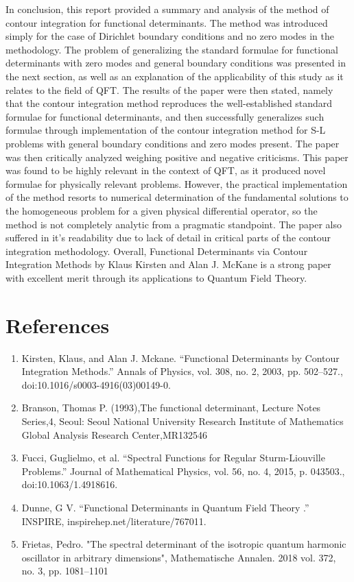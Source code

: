 \documentclass[12]{article}
\begin{document}
In conclusion, this report provided a summary and analysis of the method of contour integration for functional determinants. The method was introduced simply for the case of Dirichlet boundary conditions and no zero modes in the methodology. The problem of generalizing the standard formulae for functional determinants with zero modes and general boundary conditions was presented in the next section, as well as an explanation of the applicability of this study as it relates to the field of QFT. The results of the paper were then stated, namely that the contour integration method reproduces the well-established standard formulae for functional determinants, and then successfully generalizes such formulae through implementation of the contour integration method for S-L problems with general boundary conditions and zero modes present. The paper was then critically analyzed weighing positive and negative criticisms. This paper was found to be highly relevant in the context of QFT, as it produced novel formulae for physically relevant problems. However, the practical implementation of the method resorts to numerical determination of the fundamental solutions to the homogeneous problem for a given physical differential operator, so the method is not completely analytic from a pragmatic standpoint. The paper also suffered in it's readability due to lack of detail in critical parts of the contour integration methodology. Overall, Functional Determinants via Contour Integration Methods by Klaus Kirsten and Alan J. McKane is a strong paper with excellent merit through its applications to Quantum Field Theory. 

\clearpage

\section{References}

\begin{enumerate}
    \item{Kirsten, Klaus, and Alan J. Mckane. “Functional Determinants by Contour Integration Methods.” Annals of Physics, vol. 308, no. 2, 2003, pp. 502–527., doi:10.1016/s0003-4916(03)00149-0.}\label{func}
    \item{Branson, Thomas P. (1993),The functional determinant, Lecture Notes Series,4, Seoul: Seoul National University Research Institute of Mathematics Global Analysis Research Center,MR132546} \label{funcdet}
    \item{Fucci, Guglielmo, et al. “Spectral Functions for Regular Sturm-Liouville Problems.” Journal of Mathematical Physics, vol. 56, no. 4, 2015, p. 043503., doi:10.1063/1.4918616.}\label{spec}
    \item{Dunne, G V. “Functional Determinants in Quantum Field Theory .” INSPIRE, inspirehep.net/literature/767011.}\label{QFT}
    \item{Frietas, Pedro.  "The spectral determinant of the isotropic quantum harmonic oscillator in arbitrary dimensions", Mathematische Annalen. 2018 vol. 372, no. 3, pp. 1081--1101}\label{QFT2}
\end{enumerate}
\end{document}
